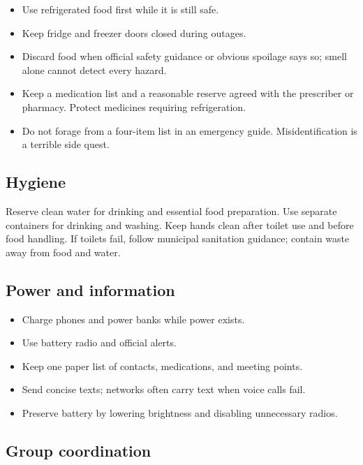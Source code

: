 \begin{itemize}
\tightlist
\item
  Use refrigerated food first while it is still safe.
\item
  Keep fridge and freezer doors closed during outages.
\item
  Discard food when official safety guidance or obvious spoilage says
  so; smell alone cannot detect every hazard.
\item
  Keep a medication list and a reasonable reserve agreed with the
  prescriber or pharmacy. Protect medicines requiring refrigeration.
\item
  Do not forage from a four-item list in an emergency guide.
  Misidentification is a terrible side quest.
\end{itemize}

\hypertarget{hygiene}{%
\subsection{Hygiene}\label{hygiene}}

Reserve clean water for drinking and essential food preparation. Use
separate containers for drinking and washing. Keep hands clean after
toilet use and before food handling. If toilets fail, follow municipal
sanitation guidance; contain waste away from food and water.

\hypertarget{power-and-information}{%
\subsection{Power and information}\label{power-and-information}}

\begin{itemize}
\tightlist
\item
  Charge phones and power banks while power exists.
\item
  Use battery radio and official alerts.
\item
  Keep one paper list of contacts, medications, and meeting points.
\item
  Send concise texts; networks often carry text when voice calls fail.
\item
  Preserve battery by lowering brightness and disabling unnecessary
  radios.
\end{itemize}

\hypertarget{group-coordination}{%
\subsection{Group coordination}\label{group-coordination}}

